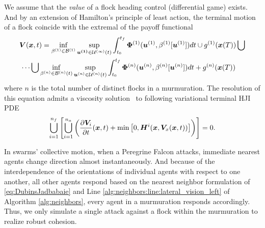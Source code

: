 We assume that the \textit{value} of a flock heading control (differential game) exists.  And by an extension of Hamilton's principle of least action, the terminal motion of a flock coincide with the extremal of the payoff functional 
%
\begin{align}
	&\bm{V}(\bm{x}, t) = \inf_{\beta^{(1)} \in \mathcal{B}^{(1)}} \sup_{\bm{u^{(1)}} \in \mathcal{U^{(1)}}(t)} \int_{t_0}^{t_f} \bm{\Phi}^{(1)} (\bm{u}^{(1)}, \beta^{(1)}[\bm{u}^{(1)}])dt \cup  g^{(1)}(\bm{x}(T)) \bigcup \nonumber
	\\
	&\, \cdots \bigcup \inf_{\beta^{(n)} \in \mathcal{B}^{(n)}(t)} \sup_{\bm{u}^{(n)} \in \mathcal{U}^{(n)}(t)} \int_{t_0}^{t_f} \bm{\Phi}^{(n)} (\bm{u}^{(n)}, \beta^{(n)}[\bm{u}^{(n)}])dt + g^{(n)}(\bm{x}(T))
\end{align}
%
%
where $n$ is the total number of distinct flocks in a murmuration. The resolution of this equation  admits a viscosity solution~\cite{Evans1984} to following variational terminal HJI PDE \cite{Mitchell2005}
%
\begin{align}
	\bigcup_{i=1}^{n_f}\left[\bigcup_{i=1}^{n_a}\left(\dfrac{\partial \bm{V}_i}{\partial t}(\bm{x}, t) + \min \left[0, \bm{H}^i(\bm{x}, \bm{V}_x(\bm{x}, t))\right]\right)\right] = 0.
	\label{eq:value_aggregate}
\end{align}
%

In swarms' collective motion, when \eg a Peregrine Falcon attacks, immediate nearest agents change direction almost instantaneously. And because of the interdependence of the orientations of individual agents with respect to one another, all other agents respond based on the nearest neighbor formulation of \eqref{eq:DubinsJadbabaie} and Line \ref{alg:neighbors:line:lateral_vision_left} of Algorithm \ref{alg:neighbors}, every agent in a murmuration responds accordingly. Thus, we only simulate a single attack against a flock within the murmuration to realize robust cohesion.  

